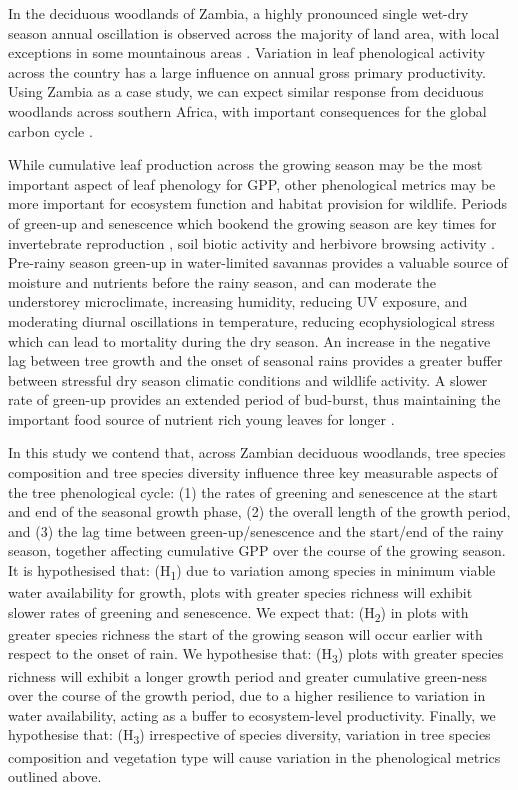 \documentclass[11pt,a4paper]{article}
\begin{document}
In the deciduous woodlands of Zambia, a highly pronounced single wet-dry season annual oscillation is observed across the majority of land area, with local exceptions in some mountainous areas \citep{}. Variation in leaf phenological activity across the country has a large influence on annual gross primary productivity. Using Zambia as a case study, we can expect similar response from deciduous woodlands across southern Africa, with important consequences for the global carbon cycle \citep{}. 

While cumulative leaf production across the growing season may be the most important aspect of leaf phenology for GPP, other phenological metrics may be more important for ecosystem function and habitat provision for wildlife. Periods of green-up and senescence which bookend the growing season are key times for invertebrate reproduction \citep{}, soil biotic activity \citep{} and herbivore browsing activity \citep{}. Pre-rainy season green-up in water-limited savannas provides a valuable source of moisture and nutrients before the rainy season, and can moderate the understorey microclimate, increasing humidity, reducing UV exposure, and moderating diurnal oscillations in temperature, reducing ecophysiological stress which can lead to mortality during the dry season. An increase in the negative lag between tree growth and the onset of seasonal rains provides a greater buffer between stressful dry season climatic conditions and wildlife activity. A slower rate of green-up provides an extended period of bud-burst, thus maintaining the important food source of nutrient rich young leaves for longer \citep{}.
 
In this study we contend that, across Zambian deciduous woodlands, tree species composition and tree species diversity influence three key measurable aspects of the tree phenological cycle: (1) the rates of greening and senescence at the start and end of the seasonal growth phase, (2) the overall length of the growth period, and (3) the lag time between green-up/senescence and the start/end of the rainy season, together affecting cumulative GPP over the course of the growing season. It is hypothesised that: (H\textsubscript{1}) due to variation among species in minimum viable water availability for growth, plots with greater species richness will exhibit slower rates of greening and senescence. We expect that: (H\textsubscript{2}) in plots with greater species richness the start of the growing season will occur earlier with respect to the onset of rain. We hypothesise that: (H\textsubscript{3}) plots with greater species richness will exhibit a longer growth period and greater cumulative green-ness over the course of the growth period, due to a higher resilience to variation in water availability, acting as a buffer to ecosystem-level productivity. Finally, we hypothesise that: (H\textsubscript{3}) irrespective of species diversity, variation in tree species composition and vegetation type will cause variation in the phenological metrics outlined above. 
\end{document}
